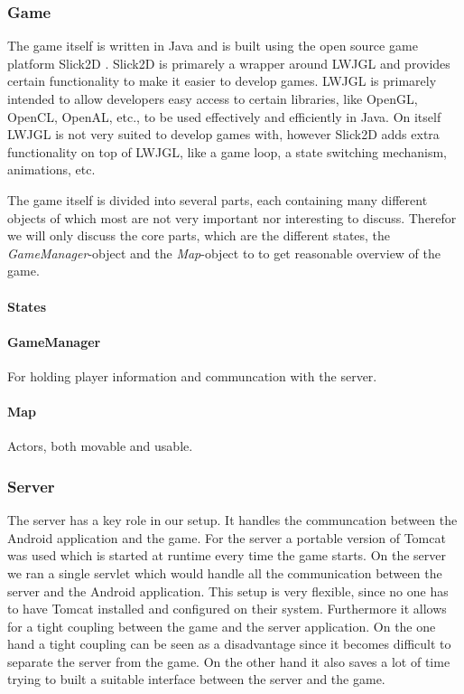 \documentclass[a4paper,10pt]{article}
\begin{document}
		\subsubsection{Game}
		The game itself is written in Java and is built using the open source game platform Slick2D \cite{Slick2D}.
		Slick2D is primarely a wrapper around LWJGL \cite{LWJGL} and provides certain functionality to make it easier to develop games.
		LWJGL is primarely intended to allow developers easy access to certain libraries, like OpenGL, OpenCL, OpenAL, etc., to be used effectively and efficiently in Java.
		On itself LWJGL is not very suited to develop games with, however Slick2D adds extra functionality on top of LWJGL, like a game loop, a state switching mechanism, animations, etc.
		
		The game itself is divided into several parts, each containing many different objects of which most are not very important nor interesting to discuss.
		Therefor we will only discuss the core parts, which are the different states, the \emph{GameManager}-object and the \emph{Map}-object to to get reasonable overview of the game.
		
		\paragraph{States}
		
		
		
		\paragraph{GameManager}
		For holding player information and communcation with the server.
		
		
		\paragraph{Map}
		Actors, both movable and usable.
		
		
		\subsubsection{Server}
		The server has a key role in our setup.
		It handles the communcation between the Android application and the game.
		For the server a portable version of Tomcat was used which is started at runtime every time the game starts.
		On the server we ran a single servlet which would handle all the communication between the server and the Android application.
		This setup is very flexible, since no one has to have Tomcat installed and configured on their system.
		Furthermore it allows for a tight coupling between the game and the server application.
		On the one hand a tight coupling can be seen as a disadvantage since it becomes difficult to separate the server from the game.
		On the other hand it also saves a lot of time trying to built a suitable interface between the server and the game.
				
\end{document}
